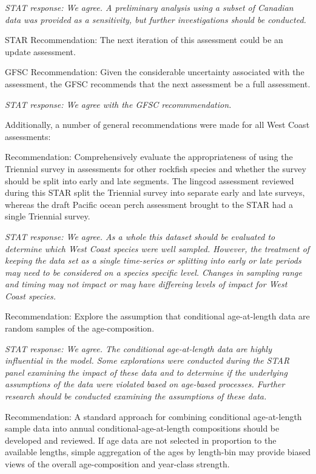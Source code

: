 \documentclass[12pt,]{article}
\begin{document}
\emph{STAT response: We agree. A preliminary analysis using a subset of
Canadian data was provided as a sensitivity, but further investigations
should be conducted.}

STAR Recommendation: The next iteration of this assessment could be an
update assessment.

GFSC Recommendation: Given the considerable uncertainty associated with
the assessment, the GFSC recommends that the next assessment be a full
assessment.

\emph{STAT response: We agree with the GFSC recommmendation.}

Additionally, a number of general recommendations were made for all West
Coast assessments:

Recommendation: Comprehensively evaluate the appropriateness of using
the Triennial survey in assessments for other rockfish species and
whether the survey should be split into early and late segments. The
lingcod assessment reviewed during this STAR split the Triennial survey
into separate early and late surveys, whereas the draft Pacific ocean
perch assessment brought to the STAR had a single Triennial survey.

\emph{STAT response: We agree. As a whole this dataset should be
evaluated to determine which West Coast species were well sampled.
However, the treatment of keeping the data set as a single time-series
or splitting into early or late periods may need to be considered on a
species specific level. Changes in sampling range and timing may not
impact or may have differeing levels of impact for West Coast species.}

Recommendation: Explore the assumption that conditional age-at-length
data are random samples of the age-composition.

\emph{STAT response: We agree. The conditional age-at-length data are
highly influential in the model. Some explorations were conducted during
the STAR panel examining the impact of these data and to determine if
the underlying assumptions of the data were violated based on age-based
processes. Further research should be conducted examining the
assumptions of these data.}

Recommendation: A standard approach for combining conditional
age-at-length sample data into annual conditional-age-at-length
compositions should be developed and reviewed. If age data are not
selected in proportion to the available lengths, simple aggregation of
the ages by length-bin may provide biased views of the overall
age-composition and year-class strength.
\end{document}
